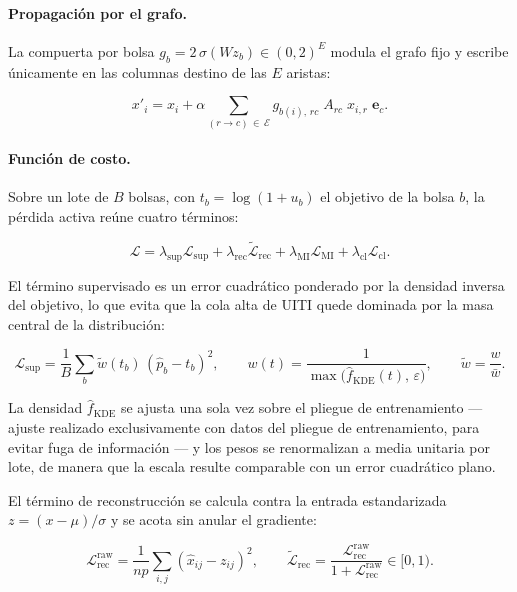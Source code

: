 \documentclass[11pt,a4paper]{article}
\begin{document}
\paragraph{Propagación por el grafo.} La compuerta por bolsa
$g_b = 2\,\sigma(W z_b) \in (0,2)^{E}$ modula el grafo fijo y escribe únicamente en las
columnas destino de las $E$ aristas:

\begin{equation}
x'_i = x_i + \alpha \sum_{(r \to c)\, \in\, \mathcal{E}} g_{b(i),\,rc}\; A_{rc}\; x_{i,r}\;
\mathbf{e}_c .
\end{equation}

\paragraph{Función de costo.} Sobre un lote de $B$ bolsas, con $t_b = \log(1 + u_b)$ el
objetivo de la bolsa $b$, la pérdida activa reúne cuatro términos:

\begin{equation}
\mathcal{L}
= \lambda_{\mathrm{sup}}\mathcal{L}_{\mathrm{sup}}
+ \lambda_{\mathrm{rec}}\tilde{\mathcal{L}}_{\mathrm{rec}}
+ \lambda_{\mathrm{MI}}\mathcal{L}_{\mathrm{MI}}
+ \lambda_{\mathrm{cl}}\mathcal{L}_{\mathrm{cl}} .
\label{eq:costo}
\end{equation}

El término supervisado es un error cuadrático ponderado por la densidad inversa del objetivo,
lo que evita que la cola alta de UITI quede dominada por la masa central de la distribución:

\begin{equation}
\mathcal{L}_{\mathrm{sup}} = \frac{1}{B}\sum_{b} \tilde{w}(t_b)\,(\hat{p}_b - t_b)^2,
\qquad
w(t) = \frac{1}{\max\!\big(\hat{f}_{\mathrm{KDE}}(t),\,\varepsilon\big)},
\qquad
\tilde{w} = \frac{w}{\bar{w}} .
\end{equation}

La densidad $\hat{f}_{\mathrm{KDE}}$ se ajusta una sola vez sobre el pliegue de entrenamiento
--- ajuste realizado exclusivamente con datos del pliegue de entrenamiento, para evitar fuga de
información --- y los pesos se renormalizan a media unitaria por lote, de manera que
la escala resulte comparable con un error cuadrático plano.

El término de reconstrucción se calcula contra la entrada estandarizada $z=(x-\mu)/\sigma$ y se
acota sin anular el gradiente:

\begin{equation}
\mathcal{L}^{\mathrm{raw}}_{\mathrm{rec}} = \frac{1}{n p}\sum_{i,j}(\hat{x}_{ij} - z_{ij})^2,
\qquad
\tilde{\mathcal{L}}_{\mathrm{rec}} = \frac{\mathcal{L}^{\mathrm{raw}}_{\mathrm{rec}}}{1 + \mathcal{L}^{\mathrm{raw}}_{\mathrm{rec}}} \in [0,1) .
\end{equation}
\end{document}
